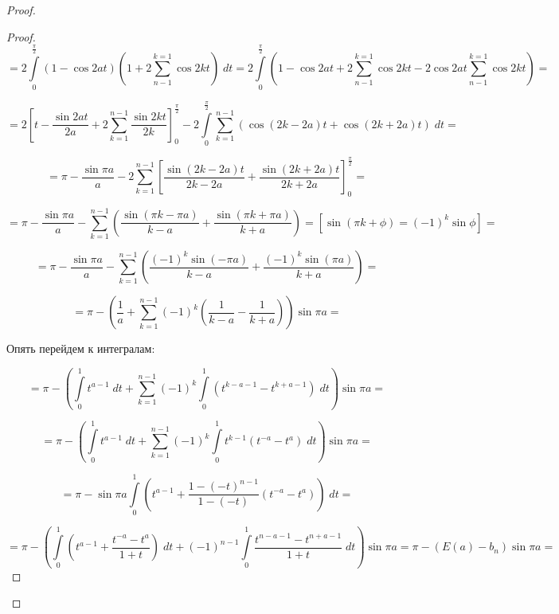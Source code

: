 \documentclass[../../main.tex]{subfiles}
\begin{document}
\begin{proof}
\begin{proof}
				\[ = 2 \int\limits_{0}^{\frac{\pi}{2}} \left( 1-\cos{2at}\right) \left( 1 
				+ 2 \sum_{n-1}^{k = 1} \cos{2k t} \right) \; dt  = 
				2\int\limits_{0}^{\frac{\pi}{2}} \left( 1-\cos{2at} + 2 \sum_{n-1}^{k = 1} 
				\cos{2k t} - 2 \cos{2at} \sum_{n-1}^{k = 1} \cos{2k t}\right) =   \]
				
				\[  = 2 \left[ t - \frac{\sin{2at}}{2a} + 2 
				\sum_{k=1}^{n-1}\frac{\sin{2kt}}{2k} \right]_{0}^{\frac{\pi}{2}} - 2 
				\int\limits_{0}^{\frac{\pi}{2}} \sum_{k=1}^{n-1} \left( \cos{(2k-2a)t} + 
				\cos{(2k+2a)t} \right) \; dt =            \]
				
				\[  = \pi - \frac{\sin{\pi a}}{a} - 2 \sum_{k=1}^{n-1} \left[ 
				\frac{\sin{(2k-2a)t}}{2k-2a} + \frac{\sin{(2k+2a)t}}{2k+2a} 
				\right]_{0}^{\frac{\pi}{2}} =       \]
				
				\[    = \pi - \frac{\sin{\pi a}}{a} -  \sum_{k=1}^{n-1} \left( 
				\frac{\sin{(\pi k- \pi a)}}{k-a} + \frac{\sin{(\pi k+ \pi a)}}{k+a} 
				\right) = \left[ \sin{(\pi k + \phi) = \left( -1\right)^k \sin{\phi}} 
				\right] =           \]
				
				\[  =   \pi - \frac{\sin{\pi a}}{a} - \sum_{k=1}^{n-1} \left( \frac{(-1)^k 
				\sin{(- \pi a)}}{k-a} + \frac{(-1)^k \sin{(\pi a)}}{k+a} \right)  =        
				  \]
				
				\[ = \pi -\left(  \frac{1}{a} + \sum_{k=1}^{n-1} (-1)^k \left( 
				\frac{1}{k-a} - \frac{1}{k+a} \right)    \right) \sin{\pi a} =        \]
				
				Опять перейдем к интегралам:
				
				\[ = \pi - \left( \int\limits_{0}^{1} t^{a-1} \; dt + \sum_{k=1}^{n-1} 
				(-1)^k \int\limits_{0}^{1} \left( t^{k-a-1} - t^{k+a - 1} \right) \; dt 
				\right)  \sin{\pi a}  =           \]
				
				\[  =  \pi - \left( \int\limits_{0}^{1} t^{a-1} \; dt + \sum_{k=1}^{n-1} 
				(-1)^k \int\limits_{0}^{1} t^{k-1} \left( t^{-a} - t^{a} \right) \; dt 
				\right)  \sin{\pi a} =      \]
				
				\[  = \pi - \sin{\pi a} \int\limits_{0}^{1} \left( t^{a-1} + 
				\frac{1-(-t)^{n-1}}{1-(-t)}\left( t^{-a} - t^{a} \right) \right) \; dt  =  
				    \]
				
				\[ = \pi - \left( \int\limits_{0}^{1} \left( t^{a-1} + \frac{t^{-a} - 
				t^a}{1+t} \right) \; dt + (-1)^{n-1} \int\limits_{0}^{1} \frac{t^{n-a-1} - 
				t^{n+a-1}}{1+t} \; dt   \right) \sin{\pi a}  = \pi - \left( E(a) - b_n 
				\right) \sin{\pi a} =    \]
				

\end{proof}
\end{proof}
\end{document}
